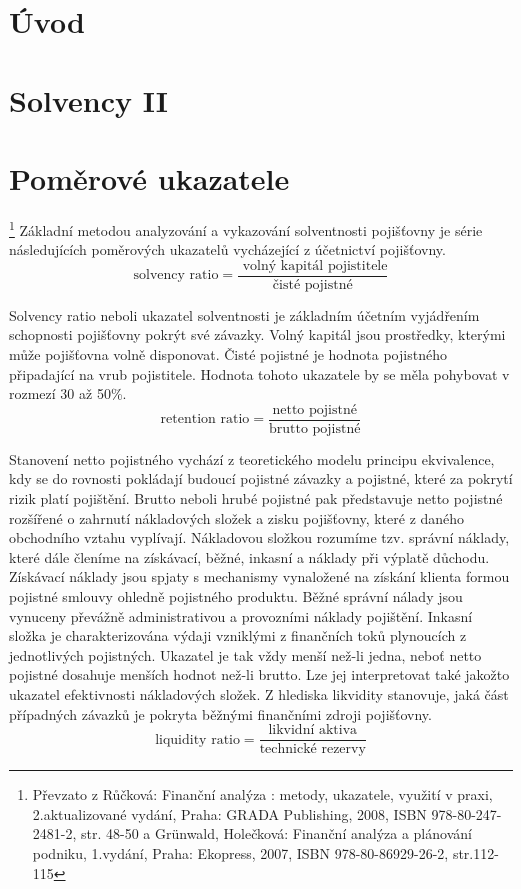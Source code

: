 \documentclass[12pt,oneside]{fithesis}
\begin{document}
\FrontMatter
\ThesisTitlePage


\MainMatter
\tableofcontents
\chapter{Úvod}
\chapter{Solvency II}
\chapter{Poměrové ukazatele}
\footnote{Převzato z Růčková: Finanční analýza : metody, ukazatele, využití v praxi, 2.aktualizované vydání, Praha: GRADA Publishing, 2008, ISBN 978-80-247-2481-2, str. 48-50 a Grünwald, Holečková: Finanční analýza a plánování podniku, 1.vydání, Praha: Ekopress, 2007, ISBN 978-80-86929-26-2, str.112-115} Základní metodou analyzování a vykazování solventnosti pojišťovny je série následujících
poměrových ukazatelů vycházející z účetnictví pojišťovny.
\[
	\text{solvency ratio} =\frac{\text{ volný kapitál pojistitele}}{\text{čisté pojistné}}
\]

Solvency ratio neboli ukazatel solventnosti je základním účetním vyjádřením schopnosti
pojišťovny pokrýt své závazky. Volný kapitál jsou prostředky, kterými může pojišťovna
volně disponovat. Čisté pojistné je hodnota pojistného připadající na vrub pojistitele. Hodnota tohoto ukazatele by se měla pohybovat v rozmezí 30 až 50\%.
\[
	\text{retention ratio} =\frac{\text{netto pojistné}}{\text{brutto pojistné}}
\]

Stanovení netto pojistného vychází z teoretického modelu principu ekvivalence, kdy se do
rovnosti pokládají budoucí pojistné závazky a pojistné, které za pokrytí rizik platí pojištění. Brutto neboli hrubé pojistné pak představuje netto pojistné rozšířené o zahrnutí nákladových složek a zisku pojišťovny, které z daného obchodního vztahu vyplívají. Nákladovou složkou rozumíme tzv. správní náklady, které dále členíme na získávací, běžné, inkasní a náklady při výplatě důchodu. Získávací náklady jsou spjaty s mechanismy vynaložené na získání klienta formou pojistné smlouvy ohledně pojistného produktu. Běžné správní nálady jsou vynuceny převážně administrativou a provozními náklady pojištění. Inkasní složka je charakterizována výdaji vzniklými z finančních toků plynoucích z jednotlivých pojistných. Ukazatel je tak vždy menší než-li jedna, neboť netto pojistné dosahuje menších hodnot než-li brutto. Lze jej interpretovat také jakožto ukazatel efektivnosti nákladových složek. Z hlediska likvidity stanovuje, jaká část případných závazků je pokryta běžnými finančními zdroji pojišťovny.
\[
	\text{liquidity ratio} =\frac{\text{likvidní aktiva}}{\text{technické rezervy}}
\]
\end{document}
